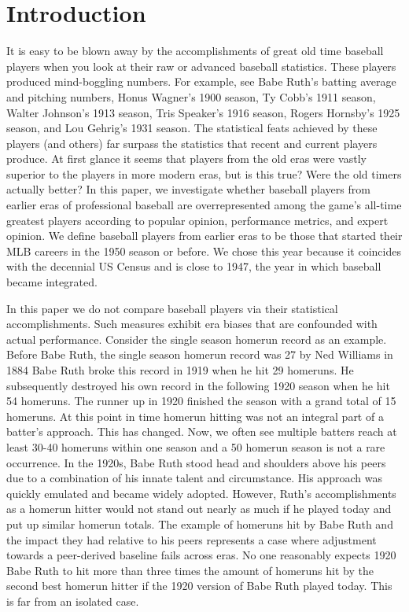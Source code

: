 \documentclass[11pt]{article}\usepackage[]{graphicx}\usepackage[]{color}
\begin{document}
\section{Introduction}
\doublespacing
It is easy to be blown away by the accomplishments of great old time 
baseball players when you look at their raw or advanced baseball statistics.  
These players produced mind-boggling numbers. For example, see 
Babe Ruth's batting average and pitching numbers, 
Honus Wagner's 1900 season, 
Ty Cobb's 1911 season, 
Walter Johnson's 1913 season, 
Tris Speaker's 1916 season, 
Rogers Hornsby's 1925 season, 
and
Lou Gehrig's 1931 season.
The statistical feats achieved by these players (and others) far surpass 
the statistics that recent and current players produce.  At first glance 
it seems that players from the old eras were vastly superior to the 
players in more modern eras, but is this true? 
Were the old timers actually better? 
In this paper, we investigate whether baseball players from earlier 
eras of professional baseball are overrepresented among the game's all-time 
greatest players according to popular opinion, performance metrics, and expert 
opinion.  We define baseball players from earlier eras to be those that 
started their MLB careers in the 1950 season or before.  
We chose this year because it coincides with the decennial US Census 
and is close to 1947, the year in which baseball became integrated. 

In this paper we do not compare baseball players via their statistical 
accomplishments.  Such measures exhibit era biases that are confounded with 
actual performance.  Consider the single season homerun record as an example. 
Before Babe Ruth, the single season homerun record was 27 by Ned Williams in 
1884 %
Babe Ruth broke this record in 1919 
when he hit 29 homeruns.  He subsequently destroyed his own record in 
the following 1920 season when he hit 54 homeruns.  The runner up in 1920 
finished the season with a grand total of 15 homeruns.  At this point in time 
homerun hitting was not an integral part of a batter's approach. %
This has changed. Now, we often see multiple batters reach at least 30-40 
homeruns within one season and a 50 homerun season is not a rare 
occurrence. %
In the 1920s, Babe Ruth stood head and shoulders above his peers due to a 
combination of his innate talent and circumstance.  
His approach was quickly emulated and became widely adopted. %
However, Ruth's accomplishments as a homerun hitter would not stand out nearly 
as much if he played today and put up similar homerun totals.    
The example of homeruns hit by Babe Ruth and the impact they had relative 
to his peers represents a case where adjustment towards a peer-derived 
baseline fails across eras.  No one reasonably expects 1920 Babe Ruth to hit 
more than three times the amount of homeruns hit by the second best homerun 
hitter if the 1920 version of Babe Ruth played today.  
This is far from an isolated case.  
\end{document}
